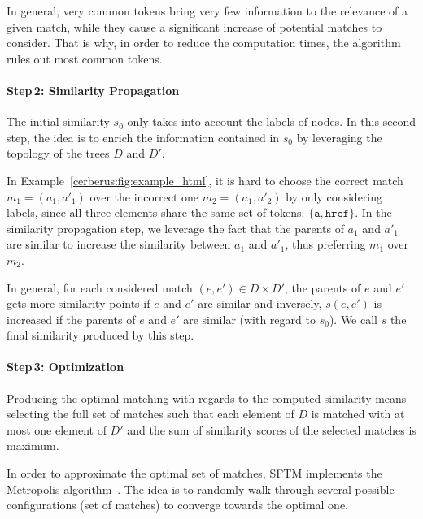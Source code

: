 In general, very common tokens bring very few information to the relevance of a given match, while they cause a significant increase of potential matches to consider.
That is why, in order to reduce the computation times, the algorithm rules out most common tokens.

\paragraph{Step\,2: Similarity Propagation}
The initial similarity $s_0$ only takes into account the labels of nodes.
In this second step, the idea is to enrich the information contained in $s_0$ by leveraging the topology of the trees $D$ and $D'$.
\begin{ex}
    In Example~\ref{cerberus:fig:example_html}, it is hard to choose the correct match $m_1 = (a_1, a'_1)$ over the incorrect one $m_2 = (a_1, a'_2)$ by only considering labels, since all three elements share the same set of tokens: $\{\texttt{a}, \texttt{href}\}$.
    In the similarity propagation step, we leverage the fact that the parents of $a_1$ and $a'_1$ are similar to increase the similarity between $a_1$ and $a'_1$, thus preferring $m_1$ over $m_2$.
\end{ex}
In general, for each considered match $(e, e') \in D \times D'$, the parents of $e$ and $e'$ gets more similarity points if $e$ and $e'$ are similar and inversely, $s(e, e')$ is increased if the parents of $e$ and $e'$ are similar (with regard to $s_0$).
We call $s$ the final similarity produced by this step.

\paragraph{Step\,3: Optimization}
Producing the optimal matching with regards to the computed similarity means selecting the full set of matches such that each element of $D$ is matched with at most one element of $D'$ and the sum of similarity scores of the selected matches is maximum.

In order to approximate the optimal set of matches, SFTM implements the Metropolis algorithm~\cite{metropolis1953equation}.
The idea is to randomly walk through several possible configurations (set of matches) to converge towards the optimal one.

